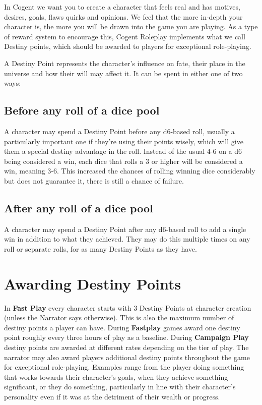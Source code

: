 In Cogent we want you to create a character that feels real and has motives, desires, goals, flaws quirks and opinions. We feel that the more in-depth your character is, the more you will be drawn into the game you are playing. As a type of reward system to encourage this, Cogent Roleplay implements what we call Destiny points, which should be awarded to players for exceptional role-playing.

A Destiny Point represents the character’s influence on fate, their place in the universe and how their will may affect it. It can be spent in either one of two ways:

\subsection{Before any roll of a dice pool} \label{subsec:before_any_roll_of_a_dice_pool}

A character may spend a Destiny Point before any d6-based roll, usually a particularly important one if they’re using their points wisely, which will give them a special destiny advantage in the roll. Instead of the usual 4-6 on a d6 being considered a win, each dice that rolls a 3 or higher will be considered a win, meaning 3-6. This increased the chances of rolling winning dice considerably but does not guarantee it, there is still a chance of failure.

\subsection{After any roll of a dice pool} \label{subsec:after_any_roll_of_a_dice_pool}

A character may spend a Destiny Point after any d6-based roll to add a single win in addition to what they achieved. They may do this multiple times on any roll or separate rolls, for as many Destiny Points as they have.

\section{Awarding Destiny Points}

In \textbf{Fast Play} every character starts with 3 Destiny Points at character creation (unless the Narrator says otherwise). This is also the maximum number of destiny points a player can have. During \textbf{Fastplay} games award one destiny point roughly every three hours of play as a baseline. During \textbf{Campaign Play} destiny points are awarded at different rates depending on the tier of play. The narrator may also award players additional destiny points throughout the game for exceptional role-playing. Examples range from the player doing something that works towards their character’s goals, when they achieve something significant, or they do something, particularly in line with their character’s personality even if it was at the detriment of their wealth or progress.